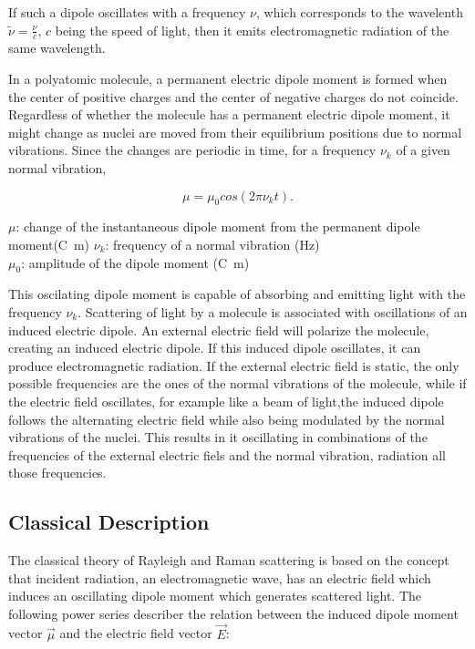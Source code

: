 \bigskip

If such a dipole oscillates with a frequency \(\nu\), which corresponds to the wavelenth \(\widetilde{\nu}=\frac{\nu}{c}\), \(c\) being the speed of light, then it emits electromagnetic radiation of the same wavelength.

\bigskip

In a polyatomic molecule, a permanent electric dipole moment is formed when the center of positive charges and the center of negative charges do not coincide. Regardless of whether the molecule has a permanent electric dipole moment, it might change as nuclei are moved from their equilibrium positions due to normal vibrations. Since the changes are periodic in time, for a frequency \(\nu_k\) of a given normal vibration, 

\begin{equation}
    \mu=\mu_0cos(2\pi\nu_kt).
\end{equation}

\(\mu\): change of the instantaneous dipole moment from the permanent dipole moment(\unit{\coulomb\meter})
\(\nu_k\): frequency of a normal vibration (\unit{\hertz})\\
\(\mu_0\): amplitude of the dipole moment (\unit{\coulomb\meter})

\bigskip

This oscilating dipole moment is capable of absorbing and emitting light with the frequency \(\nu_k\).
Scattering of light by a molecule is associated with oscillations of an induced electric dipole. An external electric field will polarize the molecule, creating an induced electric dipole. If this induced dipole oscillates, it can produce electromagnetic radiation. If the external electric field is static, the only possible frequencies are the ones of the normal vibrations of the molecule, while if the electric field oscillates, for example like a beam of light,the induced dipole follows the alternating electric field while also being modulated by the normal vibrations of the nuclei. This results in it oscillating in combinations of the frequencies of the external electric fiels and the normal vibration, radiation all those frequencies. \cite{theory1}

\subsection{Classical Description}


The classical theory of Rayleigh and Raman scattering is based on the concept that incident radiation, an electromagnetic wave, has an electric field which induces an oscillating dipole moment which generates scattered light. The following power series describer the relation between the induced dipole moment vector \(\overrightarrow{\mu} \) and the electric field vector \(\overrightarrow{E} \): 

